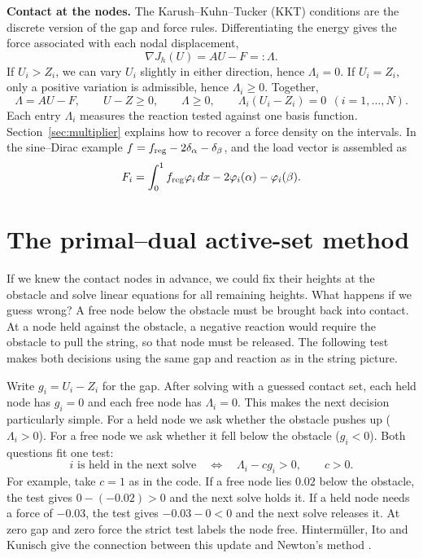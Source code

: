 \documentclass[11pt,a4paper]{article}
\newcommand{\sect}[1]{\Needspace{7\baselineskip}\section{#1}}
\begin{document}
\textbf{Contact at the nodes.} The Karush--Kuhn--Tucker (KKT) conditions are the discrete version of the gap and force rules. Differentiating the energy gives the force associated with each nodal displacement,
\[
 \nabla J_h(U)=AU-F=: \Lambda.
\]
If $U_i>Z_i$, we can vary $U_i$ slightly in either direction, hence $\Lambda_i=0$. If $U_i=Z_i$, only a positive variation is admissible, hence $\Lambda_i\geq0$. Together,
\begin{equation}\label{eq:KKT}
 \boxed{\Lambda=AU-F,\qquad U-Z\geq0,\qquad
 \Lambda\geq0,\qquad\Lambda_i(U_i-Z_i)=0\ \ (i=1,\ldots,N).}
\end{equation}
Each entry $\Lambda_i$ measures the reaction tested against one basis function. Section~\ref{sec:multiplier} explains how to recover a force density on the intervals. In the sine--Dirac example $f=f_{\rm reg}-2\delta_{\alpha}-\delta_{\beta}$, and the load vector is assembled as
\[
 F_i=\int_0^1f_{\rm reg}\varphi_i\,dx-2\varphi_i(\alpha)-\varphi_i(\beta).
\]


\sect{The primal--dual active-set method}\label{sec:pdas}
If we knew the contact nodes in advance, we could fix their heights at the
obstacle and solve linear equations for all remaining heights. What happens if
we guess wrong? A free node below the obstacle must be brought back into contact.
At a node held against the obstacle, a negative reaction would require the obstacle
to pull the string, so that node must be released. The following test makes both
decisions using the same gap and reaction as in the string picture.

Write $g_i=U_i-Z_i$ for the gap. After solving with a guessed contact set, each held node has $g_i=0$ and each free node has $\Lambda_i=0$. This makes the next decision particularly simple. For a held node we ask whether the obstacle pushes up ($\Lambda_i>0$). For a free node we ask whether it fell below the obstacle ($g_i<0$). Both questions fit one test:
\[
 i\text{ is held in the next solve}\quad\Longleftrightarrow\quad \Lambda_i-cg_i>0,\qquad c>0 .
\]
For example, take $c=1$ as in the code. If a free node lies $0.02$ below the obstacle, the test gives $0-(-0.02)>0$ and the next solve holds it. If a held node needs a force of $-0.03$, the test gives $-0.03-0<0$ and the next solve releases it. At zero gap and zero force the strict test labels the node free. Hinterm\"uller, Ito and Kunisch give the connection between this update and Newton's method \cite{hintermuller}.
\end{document}
